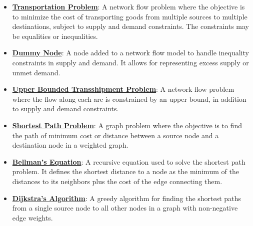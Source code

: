 \documentclass{article}%
\begin{document}
\begin{itemize}[leftmargin=*]%
\item \href{https://www.math.purdue.edu/~yipn/421/2024-11-14-NetAppls.pdf#page=1}{\textbf{Transportation Problem}}: A network flow problem where the objective is to minimize the cost of transporting goods from multiple sources to multiple destinations, subject to supply and demand constraints. The constraints may be equalities or inequalities.%
\item \href{https://www.math.purdue.edu/~yipn/421/2024-11-14-NetAppls.pdf#page=3}{\textbf{Dummy Node}}: A node added to a network flow model to handle inequality constraints in supply and demand. It allows for representing excess supply or unmet demand.%
\item \href{https://www.math.purdue.edu/~yipn/421/2024-11-14-NetAppls.pdf#page=9}{\textbf{Upper Bounded Transshipment Problem}}: A network flow problem where the flow along each arc is constrained by an upper bound, in addition to supply and demand constraints.%
\item \href{https://www.math.purdue.edu/~yipn/421/2024-11-14-NetAppls.pdf#page=13}{\textbf{Shortest Path Problem}}: A graph problem where the objective is to find the path of minimum cost or distance between a source node and a destination node in a weighted graph.%
\item \href{https://www.math.purdue.edu/~yipn/421/2024-11-14-NetAppls.pdf#page=16}{\textbf{Bellman's Equation}}: A recursive equation used to solve the shortest path problem. It defines the shortest distance to a node as the minimum of the distances to its neighbors plus the cost of the edge connecting them.%
\item \href{https://www.math.purdue.edu/~yipn/421/2024-11-14-NetAppls.pdf#page=20}{\textbf{Dijkstra's Algorithm}}: A greedy algorithm for finding the shortest paths from a single source node to all other nodes in a graph with non-negative edge weights.%
\end{itemize}%
\end{document}
